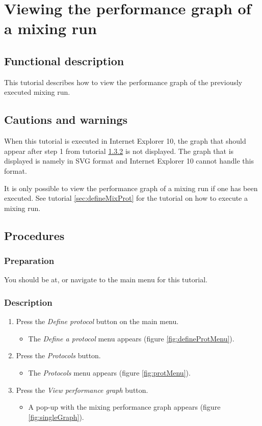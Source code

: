 \section{Viewing the performance graph of a mixing run}
\label{sec:viewsinglegraph}

\subsection{Functional description}
This tutorial describes how to view the performance graph of the previously executed mixing run.

\subsection{Cautions and warnings}
When this tutorial is executed in Internet Explorer 10, the graph that should appear after step 1 from tutorial  \ref{subsubsec:viewsinglegraphDesc} is not displayed. The graph that is displayed is namely in SVG format and Internet Explorer 10 cannot handle this format.

It is only possible to view the performance graph of a mixing run if one has been executed. See tutorial \ref{sec:defineMixProt} for the tutorial on how to execute a mixing run.

\subsection{Procedures}

\subsubsection{Preparation}
You should be at, or navigate to the main menu for this tutorial.

\subsubsection{Description}\label{subsubsec:viewsinglegraphDesc}
\begin{enumerate}
	\item Press the \emph{Define protocol} button on the main menu.
		\begin{itemize}
            \item The \emph{Define a protocol} menu appears (figure \ref{fig:defineProtMenu}).
		\end{itemize}
	\item Press the \emph{Protocols} button.
		\begin{itemize}
			\item The \emph{Protocols} menu appears (figure \ref{fig:protMenu}).
		\end{itemize}
	\item Press the \emph{View performance graph} button.
		\begin{itemize}
			\item A pop-up with the mixing performance graph appears (figure \ref{fig:singleGraph}).
		\end{itemize}	
\end{enumerate}

